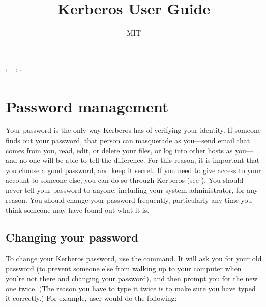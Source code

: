 \documentclass[letterpaper,10pt,english]{sphinxmanual}
\title{Kerberos User Guide}
\date{ }
\author{MIT}
\begin{document}
\ifdefined\shorthandoff
  \ifnum\catcode`\=\string=\active\shorthandoff{=}\fi
  \ifnum\catcode`\"=\active{}\fi
\fi

\pagestyle{empty}
\sphinxmaketitle
\pagestyle{plain}
\sphinxtableofcontents
\pagestyle{normal}
\label{\detokenize{user/index::doc}}


\sphinxstepscope


\chapter{Password management}
\label{\detokenize{user/pwd_mgmt:password-management}}\label{\detokenize{user/pwd_mgmt::doc}}
\sphinxAtStartPar
Your password is the only way Kerberos has of verifying your identity.
If someone finds out your password, that person can masquerade as
you—send email that comes from you, read, edit, or delete your files,
or log into other hosts as you—and no one will be able to tell the
difference.  For this reason, it is important that you choose a good
password, and keep it secret.  If you need to give access to your
account to someone else, you can do so through Kerberos (see
{\hyperref[\detokenize{user/pwd_mgmt:grant-access}]{}}).  You should never tell your password to anyone,
including your system administrator, for any reason.  You should
change your password frequently, particularly any time you think
someone may have found out what it is.


\section{Changing your password}
\label{\detokenize{user/pwd_mgmt:changing-your-password}}
\sphinxAtStartPar
To change your Kerberos password, use the {\hyperref[\detokenize{user/user_commands/kpasswd:kpasswd-1}]{}} command.
It will ask you for your old password (to prevent someone else from
walking up to your computer when you’re not there and changing your
password), and then prompt you for the new one twice.  (The reason you
have to type it twice is to make sure you have typed it correctly.)
For example, user  would do the following:

\begin{sphinxVerbatim}[commandchars=\\\{\}]
 
          
          
         
 
\end{sphinxVerbatim}
\end{document}
